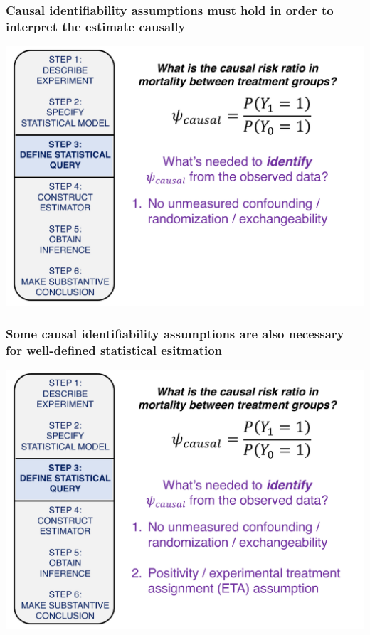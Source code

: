 \documentclass[t]{beamer}
\begin{document}

\begin{frame}
  \frametitle{Causal identifiability assumptions must hold in order to interpret the estimate causally}
  \vspace{-20pt}
  \begin{center}
  \includegraphics[width = 1.05\textwidth]{figures/causalRR_identify1.pdf}
  \end{center}
\end{frame}

\begin{frame}
  \frametitle{Some causal identifiability assumptions are also necessary for well-defined statistical esitmation}
  \vspace{-20pt}
  \begin{center}
  \includegraphics[width = 1.05\textwidth]{figures/causalRR_identify2.pdf}
  \end{center}
\end{frame}
\end{document}
